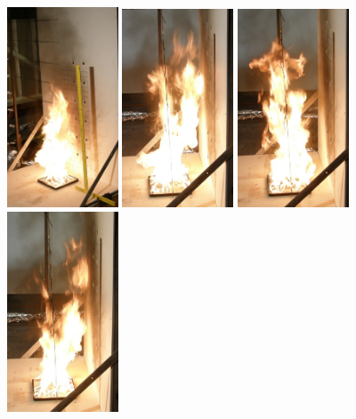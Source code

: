 \documentclass[twoside]{uocthesis}
\begin{document}
{\begin{figure}[p]
	\includegraphics[width=1.3in]{../Figures/IWGBGAS6_Seq1}
	\includegraphics[width=1.3in]{../Figures/IWGBGAS6_Seq2}
	\includegraphics[width=1.3in]{../Figures/IWGBGAS6_Seq3}
	\includegraphics[width=1.3in]{../Figures/IWGBGAS6_Seq4} \\


\end{figure}}
\end{document}
